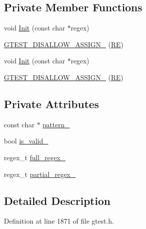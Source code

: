 \subsection*{\-Private \-Member \-Functions}
\begin{DoxyCompactItemize}
\item 
void \hyperlink{classtesting_1_1internal_1_1RE_a094803f8eca41baaeefce22926e16b81}{\-Init} (const char $\ast$regex)
\item 
\hyperlink{classtesting_1_1internal_1_1RE_a6a63598ef98cd9a2caffddbf687211e0}{\-G\-T\-E\-S\-T\-\_\-\-D\-I\-S\-A\-L\-L\-O\-W\-\_\-\-A\-S\-S\-I\-G\-N\-\_\-} (\hyperlink{classtesting_1_1internal_1_1RE}{\-R\-E})
\item 
void \hyperlink{classtesting_1_1internal_1_1RE_a094803f8eca41baaeefce22926e16b81}{\-Init} (const char $\ast$regex)
\item 
\hyperlink{classtesting_1_1internal_1_1RE_a6a63598ef98cd9a2caffddbf687211e0}{\-G\-T\-E\-S\-T\-\_\-\-D\-I\-S\-A\-L\-L\-O\-W\-\_\-\-A\-S\-S\-I\-G\-N\-\_\-} (\hyperlink{classtesting_1_1internal_1_1RE}{\-R\-E})
\end{DoxyCompactItemize}
\subsection*{\-Private \-Attributes}
\begin{DoxyCompactItemize}
\item 
const char $\ast$ \hyperlink{classtesting_1_1internal_1_1RE_a7e6314164db9144f9414dc985d07b185}{pattern\-\_\-}
\item 
bool \hyperlink{classtesting_1_1internal_1_1RE_ae7854d62fc7885f59e963a27fceafaef}{is\-\_\-valid\-\_\-}
\item 
regex\-\_\-t \hyperlink{classtesting_1_1internal_1_1RE_a22941592dd4f6d88a4c8564e5aff436d}{full\-\_\-regex\-\_\-}
\item 
regex\-\_\-t \hyperlink{classtesting_1_1internal_1_1RE_ac4bb10254cdba49a504ccf1541667d4d}{partial\-\_\-regex\-\_\-}
\end{DoxyCompactItemize}


\subsection{\-Detailed \-Description}


\-Definition at line 1871 of file gtest.\-h.



